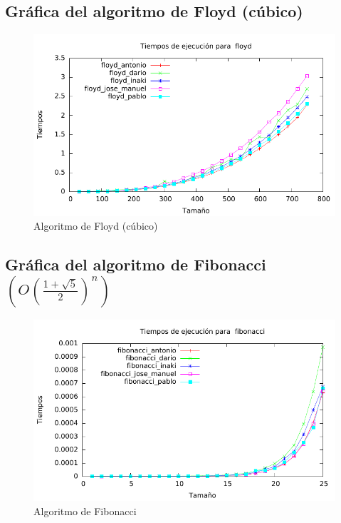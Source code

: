 \documentclass[a4paper, 11pt]{article}
\begin{document}
\newpage
\subsection{Gráfica del algoritmo de Floyd (cúbico)}
\begin{figure}[h] \includegraphics[width=13cm]{floyd_todos_g} \centering
	\caption{Algoritmo de Floyd (cúbico)} \end{figure}

\subsection{Gráfica del algoritmo de Fibonacci $(O(\frac{1+\sqrt{5}}{2})^n)$}
\begin{figure}[h] \includegraphics[width=13cm]{fibonacci_todos_g} \centering
	\caption{Algoritmo de Fibonacci} \end{figure}

\newpage
\end{document}
